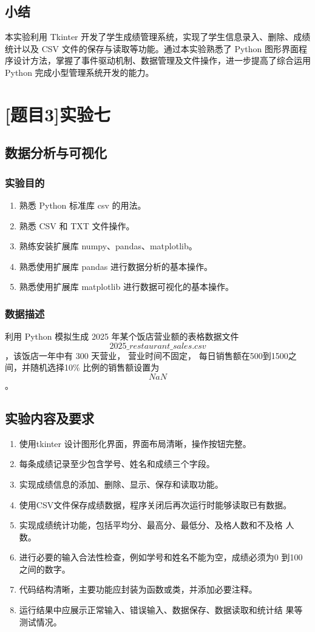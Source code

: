 \documentclass{ctexart}
\begin{document}
\subsection{小结}
本实验利用 Tkinter 开发了学生成绩管理系统，实现了学生信息录入、删除、成绩统计以及 CSV 文件的保存与读取等功能。通过本实验熟悉了 Python 图形界面程序设计方法，掌握了事件驱动机制、数据管理及文件操作，进一步提高了综合运用 Python 完成小型管理系统开发的能力。

\section{[题目3]实验七}
\subsection{数据分析与可视化}
\subsubsection{实验目的}
\begin{enumerate}
    \item 熟悉 Python 标准库 csv 的用法。
    \item 熟悉 CSV 和 TXT 文件操作。
    \item 熟练安装扩展库 numpy、pandas、matplotlib。 
    \item 熟悉使用扩展库 pandas 进行数据分析的基本操作。 
    \item 熟悉使用扩展库 matplotlib 进行数据可视化的基本操作。
\end{enumerate}

\subsubsection{数据描述}
 利用 Python 模拟生成 2025 年某个饭店营业额的表格数据文件$$2025\_restaurant\_sales.csv$$，该饭店一年中有 300 天营业，
 营业时间不固定， 每日销售额在500到1500之间，并随机选择10\%
 比例的销售额设置为$$NaN$$。
\subsection{实验内容及要求}
\begin{enumerate}
    \item 使用tkinter 设计图形化界面，界面布局清晰，操作按钮完整。
    \item 每条成绩记录至少包含学号、姓名和成绩三个字段。
    \item 实现成绩信息的添加、删除、显示、保存和读取功能。
    \item 使用CSV文件保存成绩数据，程序关闭后再次运行时能够读取已有数据。
    \item 实现成绩统计功能，包括平均分、最高分、最低分、及格人数和不及格 人数。
    \item 进行必要的输入合法性检查，例如学号和姓名不能为空，成绩必须为0 到100之间的数字。
    \item 代码结构清晰，主要功能应封装为函数或类，并添加必要注释。
    \item 运行结果中应展示正常输入、错误输入、数据保存、数据读取和统计结 果等测试情况。
    
\end{enumerate}
\end{document}
